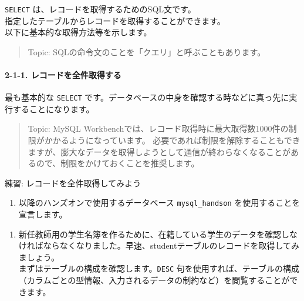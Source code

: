 \texttt{SELECT} は、レコードを取得するためのSQL文です。\\
指定したテーブルからレコードを取得することができます。\\
以下に基本的な取得方法等を示します。

\begin{quote}
Topic: SQLの命令文のことを「クエリ」と呼ぶこともあります。
\end{quote}

\paragraph{2-1-1.
レコードを全件取得する}\label{ux30ecux30b3ux30fcux30c9ux3092ux5168ux4ef6ux53d6ux5f97ux3059ux308b}

最も基本的な \texttt{SELECT}
です。データベースの中身を確認する時などに真っ先に実行することになります。

\begin{quote}
Topic: MySQL
Workbenchでは、レコード取得時に最大取得数1000件の制限がかかるようになっています。
必要であれば制限を解除することもできますが、膨大なデータを取得しようとして通信が終わらなくなることがあるので、制限をかけておくことを推奨します。
\end{quote}

練習: レコードを全件取得してみよう

\begin{enumerate}
\def\labelenumi{\arabic{enumi}.}
\setcounter{enumi}{-1}
\tightlist
\item
  以降のハンズオンで使用するデータベース \texttt{mysql\_handson}
  を使用することを宣言します。
\end{enumerate}

\begin{Shaded}
\begin{Highlighting}[]
\end{Highlighting}
\end{Shaded}

\begin{enumerate}
\def\labelenumi{\arabic{enumi}.}
\tightlist
\item
  新任教師用の学生名簿を作るために、在籍している学生のデータを確認しなければならなくなりました。早速、studentテーブルのレコードを取得してみましょう。\\
  まずはテーブルの構成を確認します。\texttt{DESC}
  句を使用すれば、テーブルの構成（カラムごとの型情報、入力されるデータの制約など）を閲覧することができます。
\end{enumerate}

